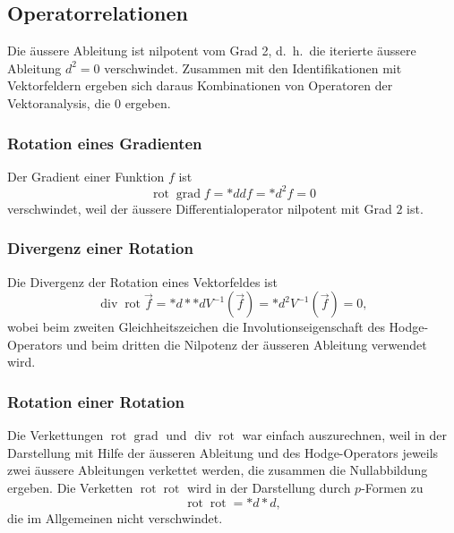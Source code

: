 %
%
\subsection{Operatorrelationen
\label{buch:vektoranalysis:subsetion:operatorrelationen}}
Die äussere Ableitung ist nilpotent vom Grad 2, d.~h.~die iterierte
äussere Ableitung $d^2=0$ verschwindet.
Zusammen mit den Identifikationen mit Vektorfeldern ergeben sich
daraus Kombinationen von Operatoren der Vektoranalysis, die
0 ergeben.

%
%
\subsubsection{Rotation eines Gradienten}
Der Gradient einer Funktion $f$ ist
\[
\operatorname{rot}\operatorname{grad}f
=
*{d}df
=
*d^2f
=
0
\]
%
verschwindet, weil der äussere Differentialoperator nilpotent mit
Grad $2$ ist.

%
%
\subsubsection{Divergenz einer Rotation}
Die Divergenz der Rotation eines Vektorfeldes ist
\[
\operatorname{div}\operatorname{rot} \vec{f}
=
*{d}{*}{*}d V^{-1}(\vec{f})
=
*d^2 V^{-1}(\vec{f})
=
0,
\]
%
wobei beim zweiten Gleichheitszeichen die Involutionseigenschaft
des Hodge-Operators und beim dritten die Nilpotenz der äusseren Ableitung
verwendet wird.

%
%
\subsubsection{Rotation einer Rotation\label{buch:vektoranalysis:subsection:rotrot}}
Die Verkettungen $\operatorname{rot}\operatorname{grad}$ und
$\operatorname{div}\operatorname{rot}$ war einfach auszurechnen,
weil in der Darstellung mit Hilfe der äusseren Ableitung und des
Hodge-Operators jeweils zwei äussere Ableitungen verkettet werden,
die zusammen die Nullabbildung ergeben.
Die Verketten $\operatorname{rot}\operatorname{rot}$ wird in der
Darstellung durch $p$-Formen zu
%
\[
\operatorname{rot}\operatorname{rot}
=
*{d}{*}d,
\]
die im Allgemeinen nicht verschwindet.


